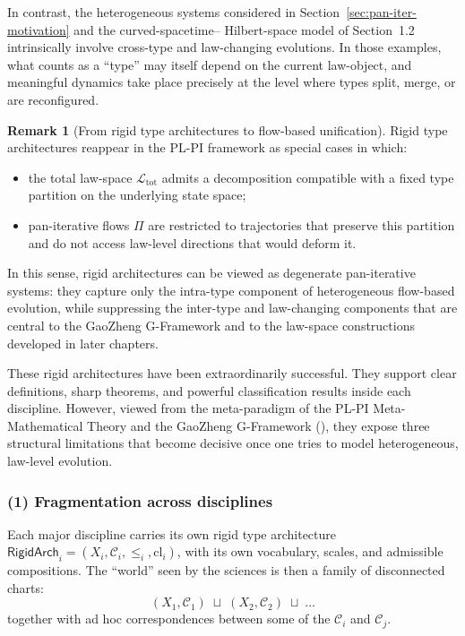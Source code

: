 \documentclass[11pt]{book}
\theoremstyle{plain}
\theoremstyle{definition}
\newtheorem{remark}[theorem]{Remark}
\newcommand{\GFramework}{\text{G-Framework}} \newcommand{\GAlgebra}{\text{G-Algebra}}
\begin{document}
In contrast, the heterogeneous systems considered in
Section~\ref{sec:pan-iter-motivation} and the curved-spacetime–
Hilbert-space model of Section~1.2 intrinsically involve cross-type
and law-changing evolutions. In those examples, what counts as a
``type'' may itself depend on the current law-object, and meaningful
dynamics take place precisely at the level where types split, merge,
or are reconfigured.

\begin{remark}[From rigid type architectures to flow-based unification]
Rigid type architectures reappear in the PL-PI framework as special
cases in which:
\begin{itemize}
  \item the total law-space $\mathcal{L}_{\mathrm{tot}}$ admits a
    decomposition compatible with a fixed type partition on the
    underlying state space;
  \item pan-iterative flows $\Pi$ are restricted to trajectories that
    preserve this partition and do not access law-level directions
    that would deform it.
\end{itemize}
In this sense, rigid architectures can be viewed as degenerate
pan-iterative systems: they capture only the intra-type component of
heterogeneous flow-based evolution, while suppressing the inter-type
and law-changing components that are central to the GaoZheng
G-Framework and to the law-space constructions developed in later
chapters.
\end{remark}



These rigid architectures have been extraordinarily successful. They
support clear definitions, sharp theorems, and powerful classification
results inside each discipline. However, viewed from the meta-paradigm
of the PL-PI Meta-Mathematical Theory and the GaoZheng G-Framework
(\GFramework), they expose three structural limitations that become
decisive once one tries to model heterogeneous, law-level evolution.



\subsubsection*{(1) Fragmentation across disciplines}

Each major discipline carries its own rigid type architecture
$\mathsf{RigidArch}_i=(X_i,\mathcal{C}_i,\leq_i,\mathrm{cl}_i)$, with
its own vocabulary, scales, and admissible compositions. The “world”
seen by the sciences is then a family of disconnected charts:
\[
  (X_1,\mathcal{C}_1)\;\sqcup\;
  (X_2,\mathcal{C}_2)\;\sqcup\;\dots
\]
together with ad hoc correspondences between some of the $\mathcal{C}_i$
and $\mathcal{C}_j$.
\end{document}
